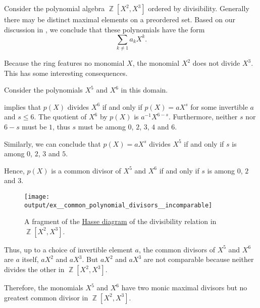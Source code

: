 \begin{example}
\begin{thmenum}
     Consider the polynomial algebra \( \BbbZ[X^2, X^3] \) ordered by divisibility. Generally there may be distinct maximal elements on a preordered set. Based on our discussion in , we conclude that these polynomials have the form
    \begin{equation*}
      \sum_{k \neq 1} a_k X^k.
    \end{equation*}

    Because the ring features no monomial \( X \), the monomial \( X^2 \) does not divide \( X^3 \). This has some interesting consequences.

    Consider the polynomials \( X^5 \) and \( X^6 \) in this domain.

     implies that \( p(X) \) divides \( X^6 \) if and only if \( p(X) = aX^s \) for some invertible \( a \) and \( s \leq 6 \). The quotient of \( X^6 \) by \( p(X) \) is \( a^{-1} X^{6-s} \). Furthermore, neither \( s \) nor \( 6 - s \) must be \( 1 \), thus \( s \) must be among \( 0 \), \( 2 \), \( 3 \), \( 4 \) and \( 6 \).

    Similarly, we can conclude that \( p(X) = aX^s \) divides \( X^5 \) if and only if \( s \) is among \( 0 \), \( 2 \), \( 3 \) and \( 5 \).

    Hence, \( p(X) \) is a common divisor of \( X^5 \) and \( X^6 \) if and only if \( s \) is among \( 0 \), \( 2 \) and \( 3 \).

    \begin{figure}[!ht]
      \centering
      \texttt{[image: output/ex\_\_common\_polynomial\_divisors\_\_incomparable]}
      \caption{A fragment of the \hyperref[def:hasse_diagram]{Hasse diagram} of the divisibility relation in \( \BbbZ[X^2, X^3] \).}
      \label{fig:ex:common_polynomial_divisors/incomparable}
    \end{figure}

    Thus, up to a choice of invertible element \( a \), the common divisors of \( X^5 \) and \( X^6 \) are \( a \) itself, \( aX^2 \) and \( aX^3 \). But \( aX^2 \) and \( aX^3 \) are not comparable because neither divides the other in \( \BbbZ[X^2, X^3] \).

    Therefore, the monomials \( X^5 \) and \( X^6 \) have two monic maximal divisors but no greatest common divisor in \( \BbbZ[X^2, X^3] \).
  \end{thmenum}
\end{example}

